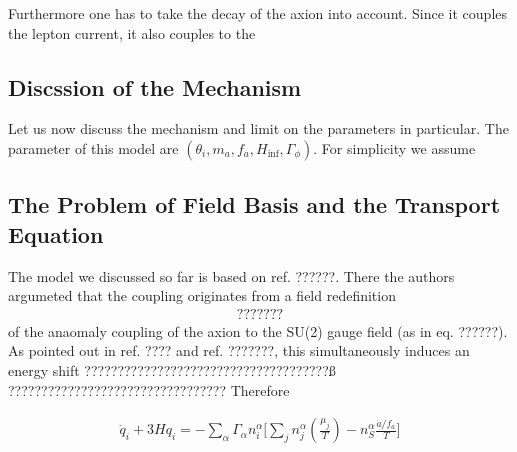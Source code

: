 \documentclass[13pt,a4paper,twoside,titlepage]{article}
\begin{document}
Furthermore one has to take the decay of the axion into account.
Since it couples the lepton current, it also couples to the

\subsection{Discssion of the Mechanism}
Let us now discuss the mechanism and limit on the parameters in particular.
The parameter of this model are $(\theta_i, m_a, f_a, H_\mathrm{inf}, \Gamma_\phi)$.
For simplicity we assume

\subsection{The Problem of Field Basis and the Transport Equation}
The model we discussed so far is based on ref. ??????.
There the authors argumeted that the coupling originates from a field redefinition
\begin{align}
    ???????
\end{align}
of the anaomaly coupling of the axion to the SU(2) gauge field (as in eq. ??????).
As pointed out in ref. ???? and ref. ???????, this simultaneously induces an energy shift
?????????????????????????????????????ß
?????????????????????????????????
Therefore

\begin{align}
    \dot{q}_i + 3 H q_i = - \sum_\alpha \Gamma_\alpha n^\alpha_i \Big[
    \sum_j n^\alpha_j \left( \frac{\mu_j}{T} \right) - n_S^\alpha \frac{\dot{a} / f_a}{T} \Big]
\end{align}


\end{document}
